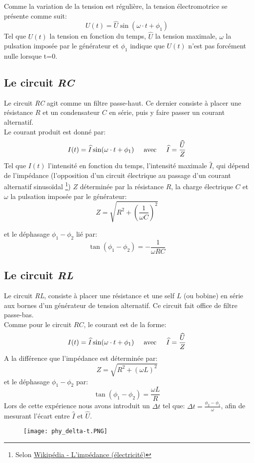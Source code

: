Comme la variation de la tension est régulière, la tension électromotrice se présente comme suit:
$$
    U(t) = \widehat{U} \sin(\omega \cdot t + \phi_1)
$$
Tel que $U(t)$ la tension en fonction du temps, $\widehat{U}$ la tension maximale, $\omega$ la pulsation imposée par le générateur et $\phi_1$ indique que $U(t)$ n'est pas forcément nulle lorsque t=0.

\subsection{Le circuit \textit{RC}}
Le circuit \textit{RC} agit comme un filtre passe-haut. Ce dernier consiste à placer une résistance $R$ et un condensateur $C$ en série, puis y faire passer un courant alternatif.\\
Le courant produit est donné par:
$$
    I(t)=\widehat{I} \sin(\omega \cdot t + \phi_1) \hspace{0.5cm} \text{avec} \hspace{0.5cm} \widehat{I} = \frac{\widehat{U}}{Z}
$$
Tel que $I(t)$ l'intensité en fonction du temps, l'intensité maximale $\widehat{I}$, qui dépend de l'impédance (l'opposition d'un circuit électrique au passage d'un courant alternatif sinusoïdal \footnote{Selon \href{https://fr.wikipedia.org/wiki/Imp\%C3\%A9dance_(\%C3\%A9lectricit\%C3\%A9)}{Wikipédia - L’impédance (électricité)}}) $Z$ déterminée par la résistance $R$, la charge électrique $C$ et $\omega$ la pulsation imposée par le générateur:
$$
    Z = \sqrt{R^2 + (\frac{1}{\omega C})^2}
$$

et le déphasage $\phi_1 - \phi_2$ lié par:
$$
    \tan(\phi_1 - \phi_2) = -\frac{1}{\omega R C}
$$


\subsection{Le circuit \textit{RL}}

Le circuit \textit{RL}, consiste à placer une résistance et une self $L$ (ou bobine) en série aux bornes d'un générateur de tension alternatif. Ce circuit fait office de filtre passe-bas.\\
Comme pour le circuit $RC$, le courant est de la forme:
$$
    I(t)=\widehat{I} \sin(\omega \cdot t + \phi_1) \hspace{0.5cm} \text{avec} \hspace{0.5cm} \widehat{I} = \frac{\widehat{U}}{Z}
$$
A la différence que l'impédance est déterminée par:
$$
    Z = \sqrt{R^2+(\omega L)^2}
$$
et le déphasage $\phi_1 - \phi_2$ par:
$$
    \tan(\phi_1 - \phi_2) = \frac{\omega L}{R}
$$
Lors de cette expérience nous avons introduit un $\Delta t$ tel que: $\Delta t = \frac{\phi_2 - \phi_1}{\omega}$, afin de mesurant l'écart entre $\widehat{I}$ et $\widehat{U}$.

\begin{figure}[H]
  \centering
    \texttt{[image: phy\_delta-t.PNG]}
\end{figure}